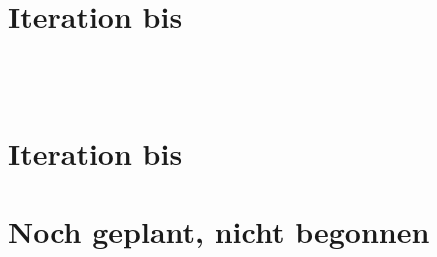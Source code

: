 \documentclass
[english,accentcolor=tud1c]
{tudreport}
\begin{document}
	\chapter{Iteration bis } %
	\\
	\\



	\chapter{Iteration bis } %



\chapter*{Noch geplant, nicht begonnen}

	\\
\end{document}
